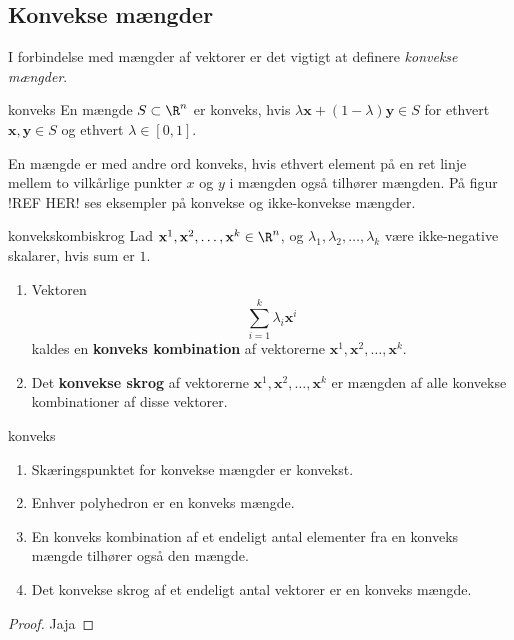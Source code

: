 \subsection{Konvekse mængder}
%
I forbindelse med mængder af vektorer er det vigtigt at definere \textit{konvekse mængder}.
\begin{defn}{}{konveks}
En mængde $S \subset \R^n$ er konveks, hvis $ \lambda \textbf{x} + (1-\lambda )\textbf{y} \in S$ for ethvert $\textbf{x}, \textbf{y} \in S$ og ethvert $ \lambda \in [0,1]$. 
\end{defn}
%
En mængde er med andre ord konveks, hvis ethvert element på en ret linje mellem to vilkårlige punkter $x$ og $y$ i mængden også tilhører mængden. 
På figur !REF HER! ses eksempler på konvekse og ikke-konvekse mængder. 
%
\begin{figure}[H]
  \centering
  \caption{}
  \label{fig:konveks}
\end{figure}
%
\begin{defn}{}{konvekskombiskrog}
Lad $\textbf{x}^1, \textbf{x}^2, \ldots, \textbf{x}^k \in \R^n$, og $\lambda_1, \lambda_2, \ldots, \lambda_k$ være ikke-negative skalarer, hvis sum er $1$. 
\begin{enumerate}[label=(\alph*)]
	\item Vektoren $$\sum_{i=1}^{k} \lambda_i \textbf{x}^i$$ kaldes en \textbf{konveks kombination} af vektorerne $\textbf{x}^1, \textbf{x}^2, \ldots, \textbf{x}^k$. 
	\item Det \textbf{konvekse skrog} af vektorerne $\textbf{x}^1, \textbf{x}^2, \ldots, \textbf{x}^k$ er mængden af alle konvekse kombinationer af disse vektorer. 
\end{enumerate}
\end{defn}
%
%
\begin{thm}{}{konveks}
\begin{enumerate}[label=(\alph*)]
	\item Skæringspunktet for konvekse mængder er konvekst. 
	\item Enhver polyhedron er en konveks mængde.
	\item En konveks kombination af et endeligt antal elementer fra en konveks mængde tilhører også den mængde. 
	\item Det konvekse skrog af et endeligt antal vektorer er en konveks mængde. 
\end{enumerate}
\end{thm}
%
%
\begin{proof}
Jaja
\end{proof}